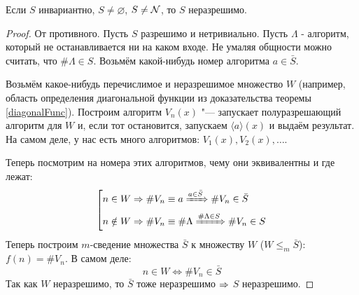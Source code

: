 \begin{theorem}
	Если $S$ инвариантно, $S \ne \varnothing$, $S \ne \mathcal{N}$, то $S$ неразрешимо.
\end{theorem}
\begin{proof}
	От противного.
	Пусть $S$ разрешимо и нетривиально.
	Пусть $\Lambda$ - алгоритм, который не останавливается ни на каком входе.
	Не умаляя общности можно считать, что $\#\Lambda \in S$.
	Возьмём какой-нибудь номер алгоритма $a \in \bar{S}$.

	Возьмём какое-нибудь перечислимое и неразрешимое множество $W$ (например, область определения диагональной функции из доказательства теоремы \ref{diagonalFunc}).
	Построим алгоритм $V_n(x)$ "--- запускает полуразрешающий алгоритм для $W$ и, если тот остановится, запускаем $\langle a \rangle(x)$ и выдаём результат.
	На самом деле, у нас есть много алгоритмов: $V_1(x), V_2(x), \dots$.

	Теперь посмотрим на номера этих алгоритмов, чему они эквивалентны и где лежат:
	\[
		\left[
			\begin{aligned}
			n \in W &\Rightarrow \#V_n \equiv a \xRightarrow{a \in \bar S} \#V_n \in \bar S \\
			n \notin W &\Rightarrow \#V_n \equiv \#\Lambda \xRightarrow{\#\Lambda \in S} \#V_n \in S
			\end{aligned}
		\right.
	\]
	Теперь построим $m$-сведение множества $\bar{S}$ к множеству $W$ ($W \le_m \bar S$): $f(n) = \#V_n$.
	В самом деле:
	\[ n \in W \iff \#V_n \in \bar S \]
	Так как $W$ неразрешимо, то $\bar S$ тоже неразрешимо $\Rightarrow$ $S$ неразрешимо.
\end{proof}

